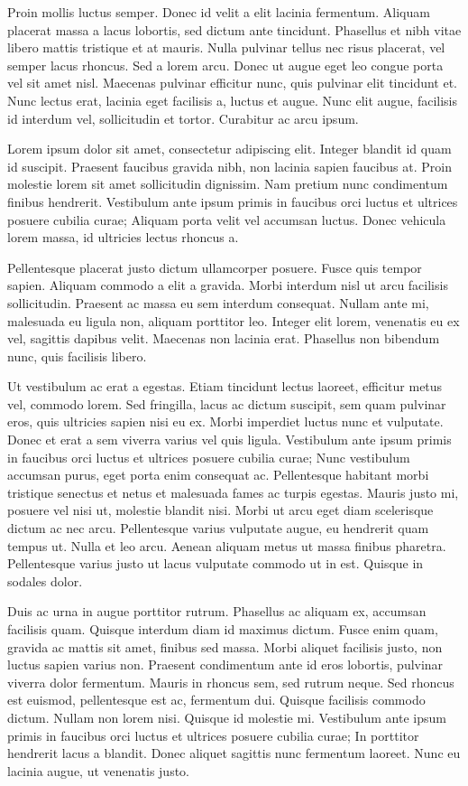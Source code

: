 \documentclass{homework}
\begin{document}
Proin mollis luctus semper. Donec id velit a elit lacinia fermentum. Aliquam placerat massa a lacus lobortis, sed dictum ante tincidunt. Phasellus et nibh vitae libero mattis tristique et at mauris. Nulla pulvinar tellus nec risus placerat, vel semper lacus rhoncus. Sed a lorem arcu. Donec ut augue eget leo congue porta vel sit amet nisl. Maecenas pulvinar efficitur nunc, quis pulvinar elit tincidunt et. Nunc lectus erat, lacinia eget facilisis a, luctus et augue. Nunc elit augue, facilisis id interdum vel, sollicitudin et tortor. Curabitur ac arcu ipsum.

Lorem ipsum dolor sit amet, consectetur adipiscing elit. Integer blandit id quam id suscipit. Praesent faucibus gravida nibh, non lacinia sapien faucibus at. Proin molestie lorem sit amet sollicitudin dignissim. Nam pretium nunc condimentum finibus hendrerit. Vestibulum ante ipsum primis in faucibus orci luctus et ultrices posuere cubilia curae; Aliquam porta velit vel accumsan luctus. Donec vehicula lorem massa, id ultricies lectus rhoncus a.

Pellentesque placerat justo dictum ullamcorper posuere. Fusce quis tempor sapien. Aliquam commodo a elit a gravida. Morbi interdum nisl ut arcu facilisis sollicitudin. Praesent ac massa eu sem interdum consequat. Nullam ante mi, malesuada eu ligula non, aliquam porttitor leo. Integer elit lorem, venenatis eu ex vel, sagittis dapibus velit. Maecenas non lacinia erat. Phasellus non bibendum nunc, quis facilisis libero.

Ut vestibulum ac erat a egestas. Etiam tincidunt lectus laoreet, efficitur metus vel, commodo lorem. Sed fringilla, lacus ac dictum suscipit, sem quam pulvinar eros, quis ultricies sapien nisi eu ex. Morbi imperdiet luctus nunc et vulputate. Donec et erat a sem viverra varius vel quis ligula. Vestibulum ante ipsum primis in faucibus orci luctus et ultrices posuere cubilia curae; Nunc vestibulum accumsan purus, eget porta enim consequat ac. Pellentesque habitant morbi tristique senectus et netus et malesuada fames ac turpis egestas. Mauris justo mi, posuere vel nisi ut, molestie blandit nisi. Morbi ut arcu eget diam scelerisque dictum ac nec arcu. Pellentesque varius vulputate augue, eu hendrerit quam tempus ut. Nulla et leo arcu. Aenean aliquam metus ut massa finibus pharetra. Pellentesque varius justo ut lacus vulputate commodo ut in est. Quisque in sodales dolor.

Duis ac urna in augue porttitor rutrum. Phasellus ac aliquam ex, accumsan facilisis quam. Quisque interdum diam id maximus dictum. Fusce enim quam, gravida ac mattis sit amet, finibus sed massa. Morbi aliquet facilisis justo, non luctus sapien varius non. Praesent condimentum ante id eros lobortis, pulvinar viverra dolor fermentum. Mauris in rhoncus sem, sed rutrum neque. Sed rhoncus est euismod, pellentesque est ac, fermentum dui. Quisque facilisis commodo dictum. Nullam non lorem nisi. Quisque id molestie mi. Vestibulum ante ipsum primis in faucibus orci luctus et ultrices posuere cubilia curae; In porttitor hendrerit lacus a blandit. Donec aliquet sagittis nunc fermentum laoreet. Nunc eu lacinia augue, ut venenatis justo.
\end{document}
